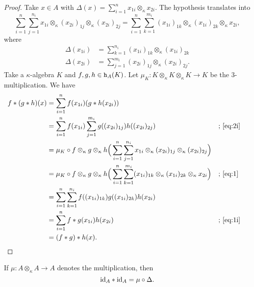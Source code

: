 \begin{proof}
    Take $x\in A$ with $\Delta(x)=\sum_{i=1}^nx_{1i}\otimes_\kappa x_{2i}$. The hypothesis translates into
    \small
    \begin{equation}\label{eq:1}
        \sum_{i=1}^n\sum_{j=1}^{n_i}
            x_{1i}\otimes_\kappa(x_{2i})_{1j}\otimes_\kappa(x_{2i})_{2j}
            = \sum_{i=1}^n\sum_{k=1}^{m_i}
            (x_{1i})_{1k}\otimes_\kappa(x_{1i})_{2k}\otimes_\kappa x_{2i},
    \end{equation}
    \normalsize
    where
    \small
    \begin{align}
        \Delta(x_{1i}) &= \sum_{k=1}^{n_i}(x_{1i})_{1k}\otimes_\kappa(x_{1i})_{2k}
            \label{eq:1i}\\
        \Delta(x_{2i}) &= \sum_{j=1}^{m_i}(x_{2i})_{1j}\otimes_\kappa(x_{2i})_{2j}.
            \label{eq:2i}
    \end{align}
    \normalsize
    Take a $\kappa$-algebra $K$ and $f,g,h\in\mathtt h_A(K)$. Let $\mu_K\colon K\otimes_\kappa K\otimes_\kappa K\to K$ be the $3$-multiplication. We have
    \small
    \begin{align*}
        f*(g*h)(x) &= \sum_{i=1}^nf(x_{1i})(g*h(x_{2i}))\\
        &= \sum_{i=1}^nf(x_{1i})\sum_{j=1}^{m_i}g((x_{2i})_{1j})h((x_{2i})_{2j})
            &&\text{; \eqref{eq:2i}}\\
        &= \mu_K\circ f\otimes_\kappa g\otimes_\kappa h\Big(
            \sum_{i=1}^n\sum_{j=1}^{n_i}
                x_{1i}
                \otimes_\kappa(x_{2i})_{1j}
                \otimes_\kappa(x_{2i})_{2j}
            \Big)\\
        &= \mu_K\circ f\otimes_\kappa g\otimes_\kappa h\Big(
            \sum_{i=1}^n\sum_{k=1}^{m_i}
                (x_{1i})_{1k}
                \otimes_\kappa(x_{1i})_{2k}
                \otimes_\kappa x_{2i}
            \Big)
                &&\text{; \eqref{eq:1}}\\
        &= \sum_{i=1}^n\sum_{k=1}^{n_i}
            f((x_{1i})_{1k})g((x_{1i})_{2k})h(x_{2i})\\
        &= \sum_{i=1}^nf*g(x_{1i})h(x_{2i})
            &&\text{; \eqref{eq:1i}}\\
        &= (f*g)*h(x).
    \end{align*}
    \normalsize \qedhere
\end{proof}

\begin{rem}
    If $\mu\colon A\otimes_\kappa A\to A$ denotes the multiplication, then 
    $$
        \text{\rm id}_A*\text{\rm id}_A = \mu\circ\Delta.
    $$
\end{rem}

